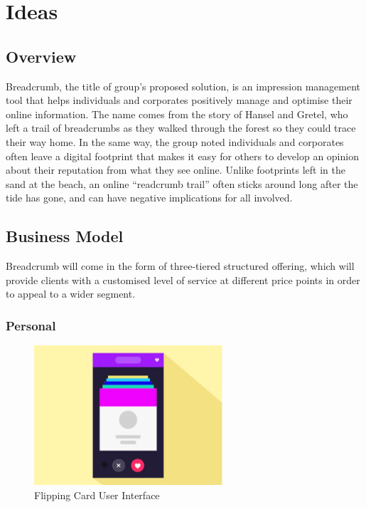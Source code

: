 \section{Ideas}

\subsection{Overview}

Breadcrumb, the title of group's proposed solution, is an impression management tool that helps individuals and corporates positively manage and optimise their online information. The name comes from the story of Hansel and Gretel, who left a trail of breadcrumbs as they walked through the forest so they could trace their way home. In the same way, the group noted individuals and corporates often leave a digital footprint that makes it easy for others to develop an opinion about their reputation from what they see online. Unlike footprints left in the sand at the beach, an online ``readcrumb trail'' often sticks around long after the tide has gone, and can have negative implications for all involved.

\subsection{Business Model}

Breadcrumb will come in the form of three-tiered structured offering, which will provide clients with a customised level of service at different price points in order to appeal to a wider segment.

\subsubsection{Personal}

\begin{figure}
  \centering
  \begin{minipage}{7cm}
    \centering
    \includegraphics[width=7cm]{inc/flip_ui.jpg}
    \caption{Flipping Card User Interface}
    \label{fig:flipUI}
  \end{minipage}
\end{figure}

